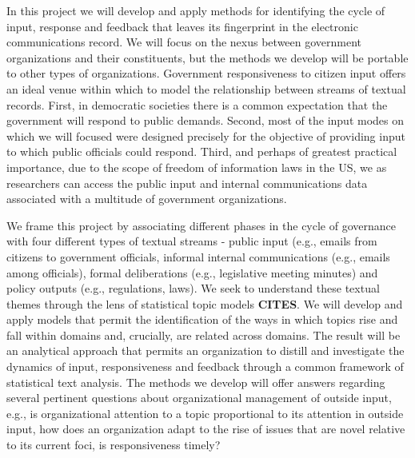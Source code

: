 In this project we will develop and apply methods for identifying the cycle of input, response and feedback that leaves its fingerprint in the electronic communications record. We will focus on the nexus between government organizations and their constituents, but the methods we develop will be portable to other types of organizations. Government responsiveness to citizen input offers an ideal venue within which to model the relationship between streams of textual records. First, in democratic societies there is a common expectation that the government will respond to public demands. Second, most of the input modes on which we will focused were designed precisely for the objective of providing input to which public officials could respond. Third, and perhaps of greatest practical importance, due to the scope of freedom of information laws in the US, we as researchers can access the public input and internal communications data associated with a multitude of government organizations.

We frame this project by associating different phases in the cycle of governance with four different types of textual streams - public input (e.g., emails from citizens to government officials, informal internal communications (e.g., emails among officials), formal deliberations (e.g., legislative meeting minutes) and policy outputs (e.g., regulations, laws). We seek to understand these textual themes through the lens of statistical topic models {\bf CITES}. We will develop and apply models that permit the identification of the ways in which topics rise and fall within domains and, crucially, are related across domains. The result will be an analytical approach that permits an organization to distill and investigate the dynamics of input, responsiveness and feedback through a common framework of statistical text analysis.  The methods we develop will offer answers regarding several pertinent questions about organizational management of outside input, e.g., is organizational attention to a topic proportional to its attention in outside input, how does an organization adapt to the rise of issues that are novel relative to its current foci, is responsiveness timely? 

